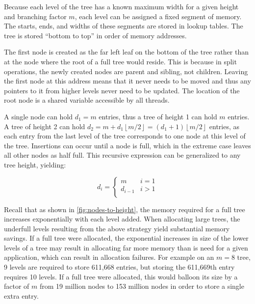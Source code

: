 Because each level of the tree has a known maximum width for a given height and
branching factor $m$, each level can be assigned a fixed segment of memory. The
starts, ends, and widths of these segments are stored in lookup tables. The tree
is stored ``bottom to top'' in order of memory addresses.

The first node is created as the far left leaf on the bottom of the tree rather
than at the node where the root of a full tree would reside. This is because in
split operations, the newly created nodes are parent and sibling, not children.
Leaving the first node at this address means that it never needs to be moved and
thus any pointers to it from higher levels never need to be updated. The
location of the root node is a shared variable accessible by all threads.


A single node can hold $d_1=m$ entries, thus a tree of height 1 can hold $m$
entries. A tree of height 2 can hold $d_2 = m + d_1\left\lfloor{m/2}\right\rfloor= 
(d_1+1)\left\lfloor{m/2}\right\rfloor$ entries, as each entry from the last
level of the tree corresponds to one node at this level of the tree. Insertions
can occur until a node is full, which in the extreme case leaves all
other nodes as half full.
%
This recursive expression can be generalized to any tree height, yielding:

{\ssp$$
	d_i = \begin{cases}
		m & i = 1 \\
		d_{i-1} & i > 1 \\
	\end{cases}
$$}

Recall that as shown in \autoref{fig:nodes-to-height}, the memory required for a
full tree increases exponentially with each level added. When allocating large
trees, the underfull levels resulting from the above strategy yield substantial
memory savings. If a full tree were allocated, the exponential increases in size
of the lower levels of a tree may result in allocating far more memory than is
need for a given application, which can result in allocation failures.
%
For example on an $m=8$ tree, 9 levels are required to store 611,668 entries,
but storing the 611,669th entry requires 10 levels. If a full tree were
allocated, this would balloon its size by a factor of $m$ from 19 million nodes
to 153 million nodes in order to store a single extra entry.

